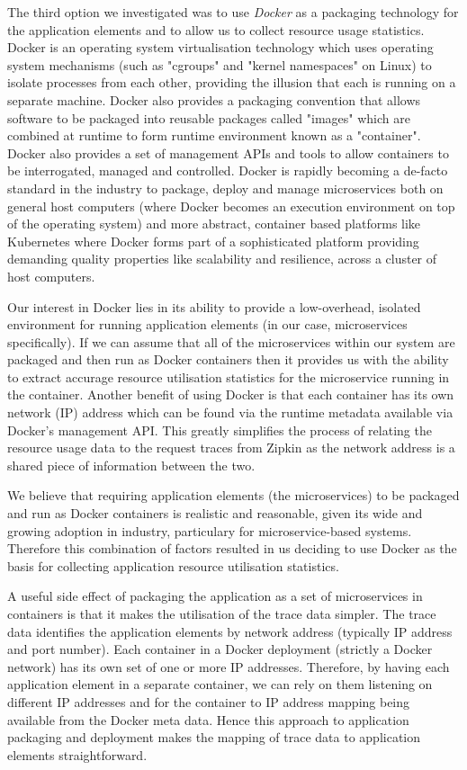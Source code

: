The third option we investigated was to use \emph{Docker} \cite{docker2018} as a packaging technology for the application elements and to allow us to collect resource usage statistics.  Docker is an operating system virtualisation technology which uses operating system mechanisms (such as "cgroups" and "kernel namespaces" on Linux) to isolate processes from each other, providing the illusion that each is running on a separate machine.  Docker also provides a packaging convention that allows software to be packaged into reusable packages called "images" which are combined at runtime to form runtime environment known as a "container".  Docker also provides a set of management APIs and tools to allow containers to be interrogated, managed and controlled.  Docker is rapidly becoming a de-facto standard in the industry to package, deploy and manage microservices both on general host computers (where Docker becomes an execution environment on top of the operating system) and more abstract, container based platforms like Kubernetes \cite{kubernetes2018} where Docker forms part of a sophisticated platform providing demanding quality properties like scalability and resilience, across a cluster of host computers.

Our interest in Docker lies in its ability to provide a low-overhead, isolated environment for running application elements (in our case, microservices specifically).  If we can assume that all of the microservices within our system are packaged and then run as Docker containers then it provides us with the ability to extract accurage resource utilisation statistics for the microservice running in the container.  Another benefit of using Docker is that each container has its own network (IP) address which can be found via the runtime metadata available via Docker's management API.  This greatly simplifies the process of relating the resource usage data to the request traces from Zipkin as the network address is a shared piece of information between the two.

We believe that requiring application elements (the microservices) to be packaged and run as Docker containers is realistic and reasonable, given its wide and growing adoption in industry, particulary for microservice-based systems.  Therefore this combination of factors resulted in us deciding to use Docker as the basis for collecting application resource utilisation statistics.

A useful side effect of packaging the application as a set of microservices in containers is that it makes the utilisation of the trace data simpler.  The trace data identifies the application elements by network address (typically IP address and port number).  Each container in a Docker deployment (strictly a Docker network) has its own set of one or more IP addresses.  Therefore, by having each application element in a separate container, we can rely on them listening on different IP addresses and for the container to IP address mapping being available from the Docker meta data.  Hence this approach to application packaging and deployment makes the mapping of trace data to application elements straightforward. 

